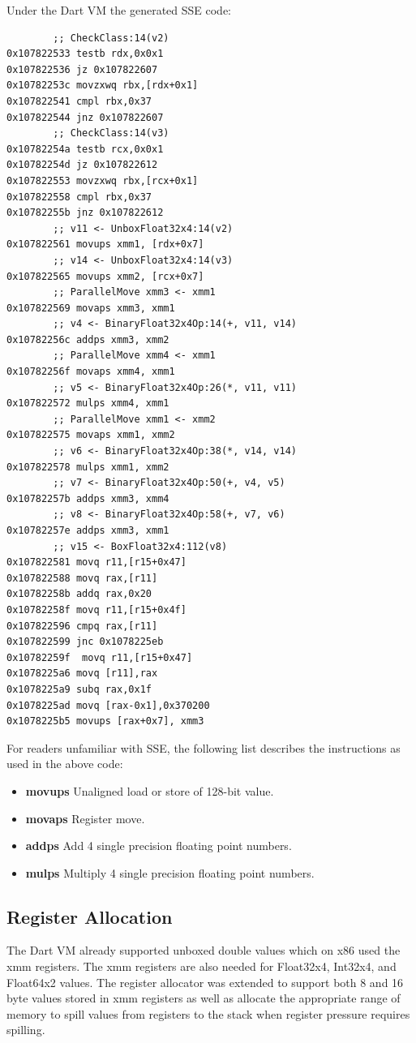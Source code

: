 \documentclass[preprint]{sigplanconf}
\begin{document}
Under the Dart VM the generated SSE code:

\begin{verbatim}
        ;; CheckClass:14(v2)
0x107822533 testb rdx,0x0x1
0x107822536 jz 0x107822607
0x10782253c movzxwq rbx,[rdx+0x1]
0x107822541 cmpl rbx,0x37
0x107822544 jnz 0x107822607
        ;; CheckClass:14(v3)
0x10782254a testb rcx,0x0x1
0x10782254d jz 0x107822612
0x107822553 movzxwq rbx,[rcx+0x1]
0x107822558 cmpl rbx,0x37
0x10782255b jnz 0x107822612
        ;; v11 <- UnboxFloat32x4:14(v2)
0x107822561 movups xmm1, [rdx+0x7]
        ;; v14 <- UnboxFloat32x4:14(v3)
0x107822565 movups xmm2, [rcx+0x7]
        ;; ParallelMove xmm3 <- xmm1
0x107822569 movaps xmm3, xmm1
        ;; v4 <- BinaryFloat32x4Op:14(+, v11, v14)
0x10782256c addps xmm3, xmm2
        ;; ParallelMove xmm4 <- xmm1
0x10782256f movaps xmm4, xmm1
        ;; v5 <- BinaryFloat32x4Op:26(*, v11, v11)
0x107822572 mulps xmm4, xmm1
        ;; ParallelMove xmm1 <- xmm2
0x107822575 movaps xmm1, xmm2
        ;; v6 <- BinaryFloat32x4Op:38(*, v14, v14)
0x107822578 mulps xmm1, xmm2
        ;; v7 <- BinaryFloat32x4Op:50(+, v4, v5)
0x10782257b addps xmm3, xmm4
        ;; v8 <- BinaryFloat32x4Op:58(+, v7, v6)
0x10782257e addps xmm3, xmm1
        ;; v15 <- BoxFloat32x4:112(v8)
0x107822581 movq r11,[r15+0x47]
0x107822588 movq rax,[r11]
0x10782258b addq rax,0x20
0x10782258f movq r11,[r15+0x4f]
0x107822596 cmpq rax,[r11]
0x107822599 jnc 0x1078225eb
0x10782259f  movq r11,[r15+0x47]
0x1078225a6 movq [r11],rax
0x1078225a9 subq rax,0x1f
0x1078225ad movq [rax-0x1],0x370200
0x1078225b5 movups [rax+0x7], xmm3
\end{verbatim}

For readers unfamiliar with SSE, the following list describes the instructions as used in the above code:
\begin{itemize}
\item \textbf{movups} Unaligned load or store of 128-bit value.
\item \textbf{movaps} Register move.
\item \textbf{addps} Add 4 single precision floating point numbers.
\item \textbf{mulps} Multiply 4 single precision floating point numbers.
\end{itemize}

\subsection{Register Allocation}
The Dart VM already supported unboxed double values which on x86 used the xmm registers. The xmm registers are also needed for Float32x4, Int32x4, and Float64x2 values. The register allocator was extended to support both 8 and 16 byte values stored in xmm registers as well as allocate the appropriate range of memory to spill values from registers to the stack when register pressure requires spilling.
\end{document}
